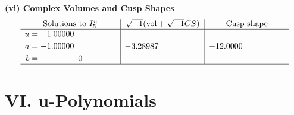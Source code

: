 \documentclass[1p]{elsarticle_modified}
\theoremstyle{definition}
\newcommand{\I}{\sqrt{-1}}
\begin{document}
\newpage\flushleft \textbf{(vi) Complex Volumes and Cusp Shapes}
$$\begin{array}{c|c|c}  
\text{Solutions to }I^u_{5}& \I (\text{vol} + \sqrt{-1}CS) & \text{Cusp shape}\\
 \hline 
\begin{aligned}
u &= -1.00000\phantom{ +0.000000I} \\
a &= -1.00000\phantom{ +0.000000I} \\
b &= \phantom{-0.000000 } 0\end{aligned}
 & -3.28987\phantom{ +0.000000I} & -12.0000\phantom{ +0.000000I}\\
 \hline 
 \end{array}$$\newpage
\newpage\renewcommand{\arraystretch}{1}
\centering \section*{ VI. u-Polynomials}
\end{document}
